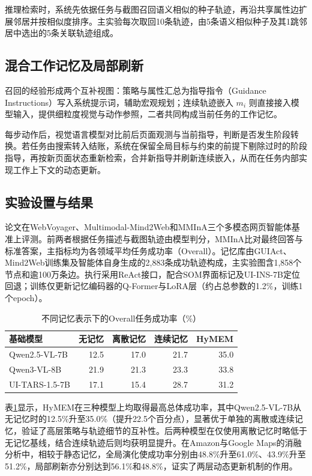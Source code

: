 推理检索时，系统先依据任务与截图召回语义相似的种子轨迹，再沿共享属性边扩展邻居并按相似度排序。主实验每次取回10条轨迹，由5条语义相似种子及其1跳邻居中选出的5条关联轨迹组成。

\subsection{混合工作记忆及局部刷新}

召回的经验形成两个互补视图：策略与属性汇总为指导指令（Guidance Instructions）写入系统提示词，辅助宏观规划；连续轨迹嵌入 $m_i$ 则直接接入模型输入，提供细粒度视觉与动作参照，二者共同构成当前任务的工作记忆。

每步动作后，视觉语言模型对比前后页面观测与当前指导，判断是否发生阶段转换。若任务由搜索转入结账，系统在保留全局目标与约束的前提下剔除过时的阶段指导，再按新页面状态重新检索，合并新指导并刷新连续嵌入，从而在任务内部实现工作上下文的动态更新。

\subsection{实验设置与结果}

论文在WebVoyager、Multimodal-Mind2Web和MMInA三个多模态网页智能体基准上评测。前两者根据任务描述与截图轨迹由模型判分，MMInA比对最终回答与标准答案，主指标均为各领域平均任务成功率（Overall）。记忆库由GUIAct、Mind2Web训练集及智能体自身生成的2,883条成功轨迹构成，主实验图含1,858个节点和逾100万条边。执行采用ReAct接口，配合SOM界面标记及UI-INS-7B定位回退；训练仅更新记忆编码器的Q-Former与LoRA层（约占总参数的1.2\%，训练1个epoch）。

\begin{table}[!htbp]
\centering
\caption{不同记忆表示下的Overall任务成功率（\%）}
\label{tab:hymem-results}
\begin{tabular}{lrrrr}
\toprule
基础模型 & 无记忆 & 离散记忆 & 连续记忆 & HyMEM \\
\midrule
Qwen2.5-VL-7B & 12.5 & 17.0 & 21.7 & 35.0 \\
Qwen3-VL-8B & 21.9 & 21.3 & 23.3 & 33.8 \\
UI-TARS-1.5-7B & 17.1 & 15.4 & 28.7 & 31.2 \\
\bottomrule
\end{tabular}
\end{table}

表\ref{tab:hymem-results}显示，HyMEM在三种模型上均取得最高总体成功率，其中Qwen2.5-VL-7B从无记忆时的12.5\%升至35.0\%（提升22.5个百分点），显著优于单独的离散或连续记忆，验证了高层策略与轨迹细节的互补性。后两种模型在仅使用离散记忆时略低于无记忆基线，结合连续轨迹后则均获明显提升。在Amazon与Google Maps的消融分析中，相较于静态记忆，全局演化使成功率分别由48.8\%升至61.0\%、43.9\%升至51.2\%，局部刷新亦分别达到56.1\%和48.8\%，证实了两层动态更新机制的作用。

